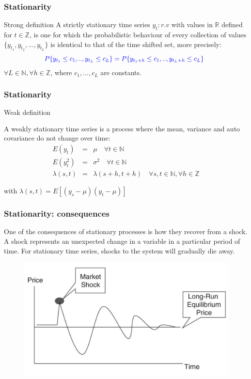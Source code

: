 \documentclass{beamer}
\begin{document}
\begin{frame}
\frametitle{Stationarity}
\begin{block}{Strong definition}
A {\color{red}strictly stationary time series} $y_t: r.v$ with values in $\mathbb{R}$ defined for $t \in \mathbb{Z}$, is one for which the probabilistic behaviour of every collection of values $\{y_{t_1},y_{t_2},\dots,y_{t_L}\}$ is identical to that of the time shifted set, more precisely:
\begin{equation*}
{\color{blue}
P\{y_{t_1} \leq
c_1,..,y_{t_L} \leq c_L\} = P\{y_{t_1+h} \leq c_1,..,y_{t_L+h} \leq c_L\}\enspace }
\end{equation*}
\noindent $\forall L \in \mathbb{N}, \forall h \in \mathbb{Z}$, where $c_1,\dots,c_L$ are constants.
\end{block}
\end{frame}

\begin{frame}
\frametitle{Stationarity}
\begin{block}{Weak definition}

A weakly stationary time series is a process where the  mean, variance and auto covariance do not change over time:
\small
{\color{blue}
 \begin{eqnarray*} E(y_t) &=& \mu  \quad
\forall t \in \mathbb{N} \\ E(y^2_t) &=& \sigma^2  \quad \forall t \in
\mathbb{N} \\ \lambda(s,t)&=&\lambda(s+h,t+h) \quad \forall s,t \in \mathbb{N},
\forall h \in \mathbb{Z} \end{eqnarray*}}
\end{block}
\noindent with $\lambda(s,t) = E[(y_s-\mu)(y_t - \mu)]$ 
\end{frame}

\begin{frame}
\frametitle{Stationarity: consequences}
One of the consequences of stationary processes is how they recover from a shock. A shock represents an unexpected change in a variable in a particular period of time. For stationary time series, shocks to the system will gradually die away. 
\begin{figure}
\includegraphics[width=0.6\paperwidth]{img/shock}
\end{figure}
\end{frame}
\end{document}

